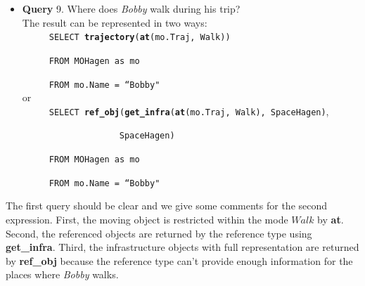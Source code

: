\begin{itemize}
 \item \textbf{Query} 9. Where does \textit{Bobby} walk during his trip? \\

The result can be represented in two ways: \\

$\hspace{1cm}$ \texttt{SELECT \textbf{trajectory}(\textbf{at}(mo.Traj, Walk))}

$\hspace{1cm}$ \texttt{FROM MOHagen as mo}

$\hspace{1cm}$ \texttt{FROM mo.Name = ``Bobby"} \\


or \\ 

$\hspace{1cm}$ \texttt{SELECT \textbf{ref\_obj}(\textbf{get\_infra}(\textbf{at}(mo.Traj, Walk), SpaceHagen)}, 

$\hspace{4cm}$ \texttt{SpaceHagen) }

$\hspace{1cm}$ \texttt{FROM MOHagen as mo}

$\hspace{1cm}$ \texttt{FROM mo.Name = ``Bobby"} \\
\end{itemize}

The first query should be clear and we give some comments for the second expression. First, the moving object is restricted within the mode $Walk$ by \textbf{at}. Second, the referenced objects are returned by the reference type using \textbf{get\_infra}. Third, the infrastructure objects with full representation are returned by \textbf{ref\_obj} because the reference type can't provide enough information for the places where \textit{Bobby} walks. \\

